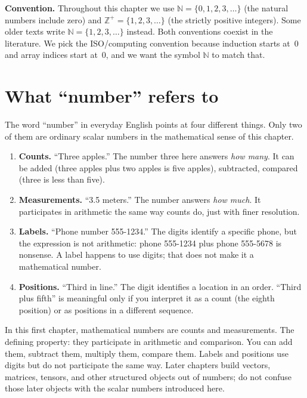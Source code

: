 \noindent\textbf{Convention.} Throughout this chapter we use $\mathbb{N} = \{0, 1, 2, 3, \ldots\}$ (the natural numbers include zero) and $\mathbb{Z}^{+} = \{1, 2, 3, \ldots\}$ (the strictly positive integers). Some older texts write $\mathbb{N} = \{1, 2, 3, \ldots\}$ instead. Both conventions coexist in the literature. We pick the ISO/computing convention because induction starts at~$0$ and array indices start at~$0$, and we want the symbol $\mathbb{N}$ to match that.


\section{What ``number'' refers to}

The word ``number'' in everyday English points at four different things. Only two of them are ordinary scalar numbers in the mathematical sense of this chapter.

\begin{enumerate}
  \item \textbf{Counts.} ``Three apples.'' The number three here answers \textit{how many}. It can be added (three apples plus two apples is five apples), subtracted, compared (three is less than five).
  \item \textbf{Measurements.} ``3.5 meters.'' The number answers \textit{how much}. It participates in arithmetic the same way counts do, just with finer resolution.
  \item \textbf{Labels.} ``Phone number 555-1234.'' The digits identify a specific phone, but the expression is not arithmetic: phone 555-1234 plus phone 555-5678 is nonsense. A label happens to use digits; that does not make it a mathematical number.
  \item \textbf{Positions.} ``Third in line.'' The digit identifies a location in an order. ``Third plus fifth'' is meaningful only if you interpret it as a count (the eighth position) or as positions in a different sequence.
\end{enumerate}

In this first chapter, mathematical numbers are counts and measurements. The defining property: they participate in arithmetic and comparison. You can add them, subtract them, multiply them, compare them. Labels and positions use digits but do not participate the same way. Later chapters build vectors, matrices, tensors, and other structured objects out of numbers; do not confuse those later objects with the scalar numbers introduced here.

